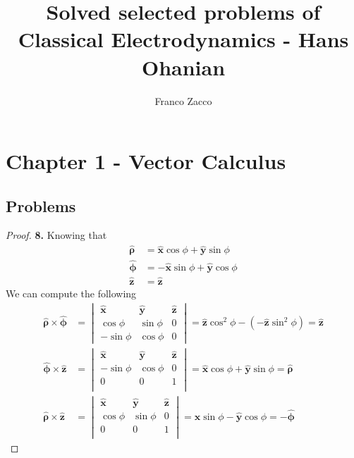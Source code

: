 \documentclass[11pt]{article}
\title{\textbf{Solved selected problems of Classical Electrodynamics - Hans Ohanian}}
\author{Franco Zacco}
\date{}
\newcommand{\hatx}{\bm{\hat{x}}}
\newcommand{\haty}{\bm{\hat{y}}}
\newcommand{\hatz}{\bm{\hat{z}}}
\newcommand{\hatrho}{\bm{\hat{\rho}}}
\newcommand{\hatphi}{\bm{\hat{\phi}}}
\theoremstyle{definition}
\begin{document}
\maketitle
\thispagestyle{empty}

\section*{Chapter 1 - Vector Calculus}

\subsection*{Problems}
\begin{proof}{\textbf{8.}}
    Knowing that
    \begin{align*}
        \hatrho &= \hatx\cos\phi + \haty\sin\phi\\
        \hatphi &= -\hatx\sin\phi + \haty\cos\phi\\
        \hatz &= \hatz
    \end{align*}
    We can compute the following
    \begin{align*}
        \hatrho \times \hatphi &= \begin{vmatrix}
            \hatx & \haty & \hatz \\
            \cos\phi & \sin\phi & 0\\
            -\sin\phi & \cos\phi & 0
        \end{vmatrix} = \hatz\cos^2\phi - (-\hatz\sin^2\phi) = \hatz\\
        \hatphi \times \hatz &= \begin{vmatrix}
            \hatx & \haty & \hatz \\
            -\sin\phi & \cos\phi & 0\\
            0 & 0 & 1 \\
        \end{vmatrix} =\hatx\cos\phi + \haty\sin\phi = \hatrho\\
        \hatrho \times \hatz &= \begin{vmatrix}
            \hatx & \haty & \hatz \\
            \cos\phi & \sin\phi & 0\\
            0 & 0 & 1 \\
        \end{vmatrix} =\hatx\sin\phi - \haty\cos\phi = -\hatphi
    \end{align*}
\end{proof}
\cleardoublepage
\end{document}
